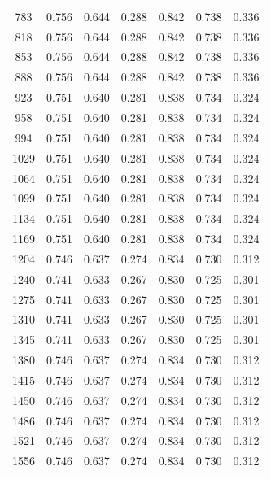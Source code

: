 \documentclass[sigplan,screen]{acmart}
\begin{document}
\begin{table}[h]
\begin{tabular}{cllllll}
      783 & 0.756 & 0.644 & 0.288 & 0.842 & 0.738 & 0.336\\
      818 & 0.756 & 0.644 & 0.288 & 0.842 & 0.738 & 0.336\\
      853 & 0.756 & 0.644 & 0.288 & 0.842 & 0.738 & 0.336\\
      888 & 0.756 & 0.644 & 0.288 & 0.842 & 0.738 & 0.336\\
      923 & 0.751 & 0.640 & 0.281 & 0.838 & 0.734 & 0.324\\
      958 & 0.751 & 0.640 & 0.281 & 0.838 & 0.734 & 0.324\\
      994 & 0.751 & 0.640 & 0.281 & 0.838 & 0.734 & 0.324\\
     1029 & 0.751 & 0.640 & 0.281 & 0.838 & 0.734 & 0.324\\
     1064 & 0.751 & 0.640 & 0.281 & 0.838 & 0.734 & 0.324\\
     1099 & 0.751 & 0.640 & 0.281 & 0.838 & 0.734 & 0.324\\
     1134 & 0.751 & 0.640 & 0.281 & 0.838 & 0.734 & 0.324\\
     1169 & 0.751 & 0.640 & 0.281 & 0.838 & 0.734 & 0.324\\
     1204 & 0.746 & 0.637 & 0.274 & 0.834 & 0.730 & 0.312\\
     1240 & 0.741 & 0.633 & 0.267 & 0.830 & 0.725 & 0.301\\
     1275 & 0.741 & 0.633 & 0.267 & 0.830 & 0.725 & 0.301\\
     1310 & 0.741 & 0.633 & 0.267 & 0.830 & 0.725 & 0.301\\
     1345 & 0.741 & 0.633 & 0.267 & 0.830 & 0.725 & 0.301\\
     1380 & 0.746 & 0.637 & 0.274 & 0.834 & 0.730 & 0.312\\
     1415 & 0.746 & 0.637 & 0.274 & 0.834 & 0.730 & 0.312\\
     1450 & 0.746 & 0.637 & 0.274 & 0.834 & 0.730 & 0.312\\
     1486 & 0.746 & 0.637 & 0.274 & 0.834 & 0.730 & 0.312\\
     1521 & 0.746 & 0.637 & 0.274 & 0.834 & 0.730 & 0.312\\
     1556 & 0.746 & 0.637 & 0.274 & 0.834 & 0.730 & 0.312\\
    \bottomrule
    \end{tabular}
\end{table}
\end{document}
